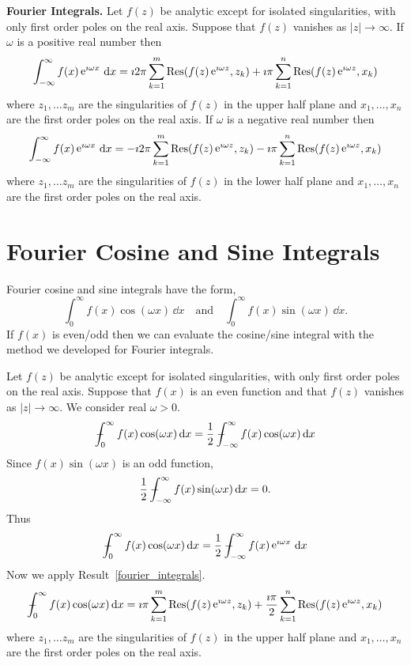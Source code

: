 \begin{Result}
  \label{fourier_integrals}
  \textbf{Fourier Integrals.}
  Let $f(z)$ be analytic except for isolated singularities, with only 
  first order poles on the real axis.  Suppose that $f(z)$ vanishes as 
  $|z| \to \infty$.  If $\omega$ is a positive real number then
  \[
  \int_{-\infty}^\infty f(x) \mathop{\mathrm{e}}\nolimits^{\imath \omega x} \,\mathrm{d} x
  = \imath 2 \pi \sum_{k = 1}^m \mathop{\mathrm{Res}}\nolimits( f(z) \mathop{\mathrm{e}}\nolimits^{\imath \omega z}, z_k )
  + \imath \pi \sum_{k = 1}^n \mathop{\mathrm{Res}}\nolimits( f(z) \mathop{\mathrm{e}}\nolimits^{\imath \omega z}, x_k )
  \]
  where $z_1, \ldots z_m$ are the singularities of $f(z)$ in the upper half 
  plane and $x_1, \ldots, x_n$ are the first order poles on the real axis.  
  If $\omega$ is a negative real number then
  \[
  \int_{-\infty}^\infty f(x) \mathop{\mathrm{e}}\nolimits^{\imath \omega x} \,\mathrm{d} x
  = - \imath 2 \pi \sum_{k = 1}^m \mathop{\mathrm{Res}}\nolimits( f(z) \mathop{\mathrm{e}}\nolimits^{\imath \omega z}, z_k )
  - \imath \pi \sum_{k = 1}^n \mathop{\mathrm{Res}}\nolimits( f(z) \mathop{\mathrm{e}}\nolimits^{\imath \omega z}, x_k )
  \]
  where $z_1, \ldots z_m$ are the singularities of $f(z)$ in the lower half 
  plane and $x_1, \ldots, x_n$ are the first order poles on the real axis.  
\end{Result}











\section{Fourier Cosine and Sine Integrals}






Fourier cosine and sine integrals have the form,
\[
\int_0^\infty f(x) \cos (\omega x) \,\dd x \quad \mathrm{and} \quad
\int_0^\infty f(x) \sin (\omega x) \,\dd x.
\]
If $f(x)$ is even/odd then we can evaluate the cosine/sine integral with
the method we developed for Fourier integrals.



Let $f(z)$ be analytic except for isolated singularities, with only 
first order poles on the real axis.  Suppose that $f(x)$ is an even function 
and that $f(z)$ vanishes as $|z| \to \infty$.  We consider real $\omega > 0$. 
\[
\pv \int_0^\infty f(x) \cos (\omega x) \,\dd x 
= \frac{1}{2} \pv \int_{-\infty}^\infty f(x) \cos( \omega x )\,\dd x 
\]
Since $f(x) \sin( \omega x)$ is an odd function,
\[
\frac{1}{2} - \negthickspace \negthickspace \negthickspace \negmedspace \int_{-\infty}^\infty f(x) \sin( \omega x )\,\mathrm{d} x = 0.
\]
Thus
\[
\pv \int_0^\infty f(x) \cos (\omega x) \,\dd x 
= \frac{1}{2} \pv \int_{-\infty}^\infty f(x) \e^{\imath \omega x}\,\dd x 
\]
Now we apply Result~\ref{fourier_integrals}.
\[
- \negthickspace \negthickspace \negthickspace \negmedspace \int_0^\infty f(x) \cos (\omega x) \,\mathrm{d} x 
= \imath \pi \sum_{k = 1}^m \mathop{\mathrm{Res}}\nolimits( f(z) \mathop{\mathrm{e}}\nolimits^{\imath \omega z}, z_k )
+ \frac{\imath \pi}{2} \sum_{k = 1}^n \mathop{\mathrm{Res}}\nolimits( f(z) \mathop{\mathrm{e}}\nolimits^{\imath \omega z}, x_k )
\]
where $z_1, \ldots z_m$ are the singularities of $f(z)$ in the upper half 
plane and $x_1, \ldots, x_n$ are the first order poles on the real axis.  


